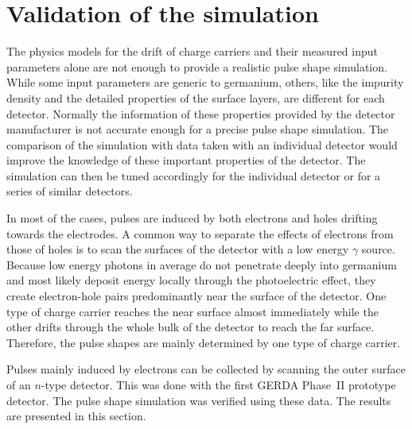 \documentclass[epj,referee]{svjour}
\begin{document}
\section{Validation of the simulation}
\label{s:psv}
The physics models \cite{miha,bart} for the drift of charge carriers
and their measured input parameters \cite{miha,reg,bart} alone are not
enough to provide a realistic pulse shape simulation. While some input
parameters are generic to germanium, others, like the impurity density
and the detailed properties of the surface layers, are different for
each detector. Normally the information of these properties provided
by the detector manufacturer is not accurate enough for a precise
pulse shape simulation. The comparison of the simulation with data
taken with an individual detector would improve the knowledge of these
important properties of the detector. The simulation can then be tuned
accordingly for the individual detector or for a series of similar
detectors.

In most of the cases, pulses are induced by both electrons and holes
drifting towards the electrodes. A common way to separate the effects
of electrons from those of holes is to scan the surfaces of the
detector with a low energy $\gamma$ source. Because low energy photons
in average do not penetrate deeply into germanium and most likely
deposit energy locally through the photoelectric effect, they create
electron-hole pairs predominantly near the surface of the
detector. One type of charge carrier reaches the near surface almost
immediately while the other drifts through the whole bulk of the
detector to reach the far surface. Therefore, the pulse shapes are
mainly determined by one type of charge carrier.

Pulses mainly induced by electrons can be collected by scanning the
outer surface of an $n$-type detector. This was done with the first
GERDA Phase~II prototype detector. \cite{si} The pulse shape
simulation was verified using these data. The results are presented in
this section.
\end{document}
